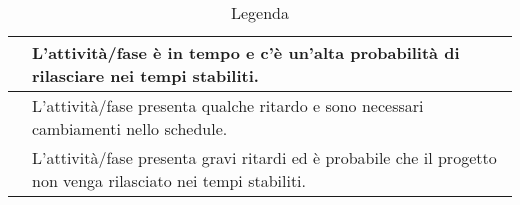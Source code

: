 \begin{table}[b]
 \centering
 \begin{tabular}{|p{3cm}|p{10cm}|}
  \hline
  \cellcolor{green}			& L'attività/fase è in tempo e c'è un'alta probabilità di rilasciare nei tempi stabiliti.\\
  \hline
  \cellcolor{yellow}			& L'attività/fase presenta qualche ritardo e sono necessari cambiamenti nello schedule.\\
  \hline
  \cellcolor{red}			& L'attività/fase presenta gravi ritardi ed è probabile che il progetto non venga rilasciato nei tempi stabiliti.\\
  \hline
 \end{tabular}
 \caption{Legenda}
\end{table}
